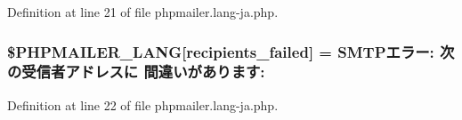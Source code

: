 Definition at line 21 of file phpmailer.\+lang-\/ja.\+php.

\subsubsection[{\texorpdfstring{\$\+P\+H\+P\+M\+A\+I\+L\+E\+R\+\_\+\+L\+A\+NG}{$PHPMAILER_LANG}}]{\setlength{\rightskip}{0pt plus 5cm}\$P\+H\+P\+M\+A\+I\+L\+E\+R\+\_\+\+L\+A\+NG\mbox{[}\textquotesingle{}recipients\+\_\+failed\textquotesingle{}\mbox{]} = \textquotesingle{}S\+M\+T\+Pエラー\+: 次の受信者アドレスに 間違いがあります\+: \textquotesingle{}}\hypertarget{phpmailer_8lang-ja_8php_a7589d30bb9b368327c2df015f3e6bcba}{}\label{phpmailer_8lang-ja_8php_a7589d30bb9b368327c2df015f3e6bcba}


Definition at line 22 of file phpmailer.\+lang-\/ja.\+php.

